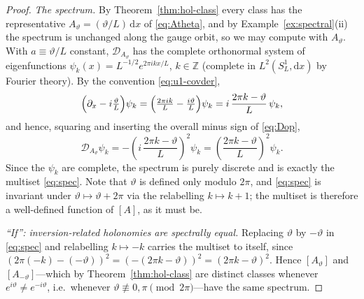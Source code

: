 \documentclass[11pt,a4paper]{article}
\theoremstyle{plain}
\theoremstyle{definition}
\theoremstyle{remark}
\newcommand{\Int}{\mathbb{Z}}
\begin{document}
\begin{proof}
\emph{The spectrum.} By Theorem~\ref{thm:hol-class} every class has the representative
$A_\vartheta=(\vartheta/L)\,\mathrm{d}x$ of \eqref{eq:Atheta}, and by
Example~\ref{ex:spectral}(ii) the spectrum is unchanged along the gauge orbit, so we may compute
with $A_\vartheta$. With $a\equiv\vartheta/L$ constant, $\mathcal{D}_{A_\vartheta}$ has the
complete orthonormal system of eigenfunctions $\psi_k(x)=L^{-1/2}e^{2\pi i k x/L}$, $k\in\Int$
(complete in $L^2(S^1_L,\mathrm{d}x)$ by Fourier theory). By the convention \eqref{eq:u1-covder},
\[
\Bigl(\partial_x-i\tfrac{\vartheta}{L}\Bigr)\psi_k
=\Bigl(\tfrac{2\pi i k}{L}-\tfrac{i\vartheta}{L}\Bigr)\psi_k
=i\,\frac{2\pi k-\vartheta}{L}\,\psi_k ,
\]
and hence, squaring and inserting the overall minus sign of \eqref{eq:Dop},
\[
\mathcal{D}_{A_\vartheta}\psi_k
=-\left(i\,\frac{2\pi k-\vartheta}{L}\right)^{\!2}\psi_k
=\left(\frac{2\pi k-\vartheta}{L}\right)^{\!2}\psi_k .
\]
Since the $\psi_k$ are complete, the spectrum is purely discrete and is exactly the multiset
\eqref{eq:spec}. Note that $\vartheta$ is defined only modulo $2\pi$, and \eqref{eq:spec} is
invariant under $\vartheta\mapsto\vartheta+2\pi$ via the relabelling $k\mapsto k+1$; the multiset
is therefore a well-defined function of $[A]$, as it must be.

\emph{``If'': inversion-related holonomies are spectrally equal.} Replacing $\vartheta$ by
$-\vartheta$ in \eqref{eq:spec} and relabelling $k\mapsto -k$ carries the multiset to itself, since
$(2\pi(-k)-(-\vartheta))^2=(-(2\pi k-\vartheta))^2=(2\pi k-\vartheta)^2$. Hence
$[A_\vartheta]$ and $[A_{-\vartheta}]$---which by Theorem~\ref{thm:hol-class} are distinct classes
whenever $e^{i\vartheta}\neq e^{-i\vartheta}$, i.e.\ whenever
$\vartheta\not\equiv0,\pi\pmod{2\pi}$---have the same spectrum.


\end{proof}
\end{document}
